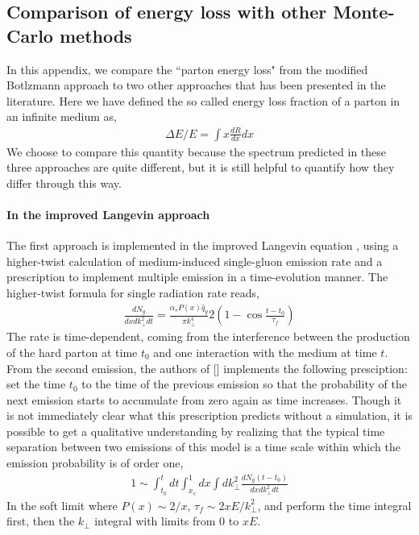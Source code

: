 \documentclass[aps, prc, reprint, amsmath, groupedaddress, nofootinbib]{revtex4-1}
\begin{document}
\begin{appendices}
\section{Comparison of energy loss with other Monte-Carlo methods}
In this appendix, we compare the ``parton energy loss" from the modified Botlzmann approach to two other approaches that has been presented in the literature.
Here we have defined the so called energy loss fraction of a parton in an infinite medium as,
\begin{eqnarray}
\Delta E/E = \int x \frac{dR}{dx} dx
\end{eqnarray}
We choose to compare this quantity because the spectrum predicted in these three approaches are quite different, but it is still helpful to quantify how they differ through this way.

\paragraph{In the improved Langevin approach}
The first approach is implemented in the improved Langevin equation \cite{Cao:2013ita}, using a higher-twist calculation of  medium-induced single-gluon emission rate and a prescription to implement multiple emission in a time-evolution manner.
The higher-twist formula for single radiation rate reads,
\begin{eqnarray}
\frac{dN_g}{dx dk_\perp^2 dt} = \frac{\alpha_s P(x)\hat{q}_g}{\pi k_\perp^4} 2\left(1-\cos\frac{t-t_0}{\tau_f}\right)
\end{eqnarray}
The rate is time-dependent, coming from the interference between the production of the hard parton at time $t_0$ and one interaction with the medium at time $t$.
From the second emission, the authors of [] implements the following presciption: set the time $t_0$ to the time of the previous emission so that the probability of the next emission starts to accumulate from zero again as time increases.
Though it is not immediately clear what this prescription predicts without a simulation, it is possible to get a qualitative understanding by realizing that the typical time separation between two emissions of this model is a time scale within which the emission probability is of order one,
\begin{eqnarray}
1 \sim \int_{t_0}^{t} dt\int_{x_c}^1 dx \int dk_\perp^2 \frac{dN_g(t-t_0)}{dx dk_\perp^2 dt}
\end{eqnarray}
In the soft limit where $P(x) \sim 2/x$, $\tau_f\sim 2xE/k_\perp^2$, and perform the time integral first, then the $k_\perp$ integral with limits from $0$ to $xE$.

\end{appendices}
\end{document}
